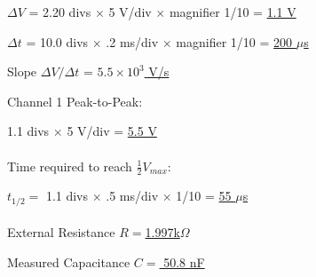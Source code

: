 \documentclass[twocolumn,english]{IEEEtran}
\theoremstyle{plain}
\theoremstyle{plain}
\begin{document}
$\Delta V$ = 2.20 divs $\times$ 5 V/div $\times$ magnifier 1/10 = \hfill\underline{1.1 V}

$\Delta t$ = 10.0 divs $\times$ .2 ms/div $\times$ magnifier 1/10 = \hfill\underline{200 $\mu$s}

Slope $\Delta V / \Delta t$ = \hfill \underline{$5.5 \times 10^3$ V/s}

\hrulefill

Channel 1 Peak-to-Peak:

1.1 divs $\times$ 5 V/div = \hfill\underline{5.5 V} \\ \\

Time required to reach $\frac{1}{2}V_{max}$:

$t_{1/2} = $ 1.1 divs $\times$ .5 ms/div $\times$ 1/10 = \hfill\underline{55 $\mu$s} \\ \\

External Resistance \hfill\underline{$R = $1.997k$\Omega$}

Measured Capacitance \hfill\underline{$C = $ 50.8 nF}



\appendices{}

%
%
\end{document}
